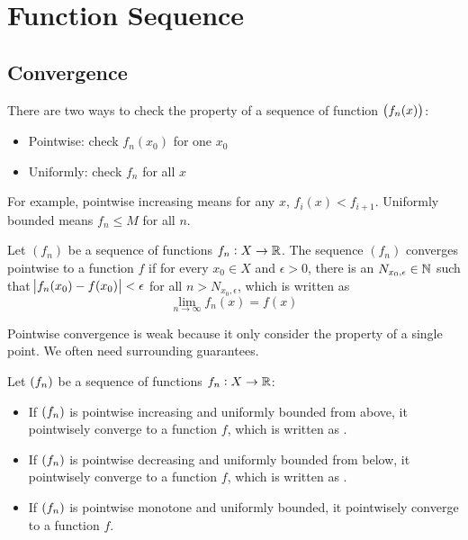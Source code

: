 \chapter{Function Sequence}



\section{Convergence}

There are two ways to check the property of a sequence of function $\sequence{f_n (x)}$:
\begin{itemize}
    \item Pointwise: check $f_n (x_0)$ for one $x_0$
    \item Uniformly: check $f_n$ for all $x$
\end{itemize}

For example, pointwise increasing means for any $x$, $f_i (x) < f_{i+1}$. Uniformly bounded means $f_n \leq M$ for all $n$.

\begin{definition}
    Let $(f_n)$ be a sequence of functions $f_n : X \rightarrow \mathbb{R}$. The sequence $(f_n)$ converges pointwise to a function $f$ if for every $x_0 \in X$ and $\epsilon > 0$, there is an $N_{x_0, \epsilon} \in \mathbb{N}$ such that $\abs{f_n (x_0) - f(x_0)} < \epsilon$ for all $n > N_{x_0, \epsilon}$, which is written as
    \begin{equation}
        \lim_{n \rightarrow \infty} f_n (x) = f(x)
    \end{equation}
\end{definition}

Pointwise convergence is weak because it only consider the property of a single point. We often need surrounding guarantees.

\begin{definition}
    Let $\sequence{f_n}$ be a sequence of functions $f_n : X \rightarrow \mathbb{R}$:
    \begin{itemize}
        \item If $\sequence{f_n}$ is pointwise increasing and uniformly bounded from above, it pointwisely converge to a function $f$, which is written as .
        \item If $\sequence{f_n}$ is pointwise decreasing and uniformly bounded from below, it pointwisely converge to a function $f$, which is written as .
        \item If $\sequence{f_n}$ is pointwise monotone and uniformly bounded, it pointwisely converge to a function $f$.
    \end{itemize}
\end{definition}


